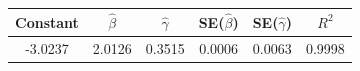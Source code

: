 \begin{tabular}{cccccc}
\toprule
Constant & $\hat{\beta}$ & $\hat{\gamma}$ & SE($\hat{\beta}$) & SE($\hat{\gamma}$) & $R^2$ \\
\midrule
-3.0237 & 2.0126 & 0.3515 & 0.0006 & 0.0063 & 0.9998 \\
\bottomrule
\end{tabular}